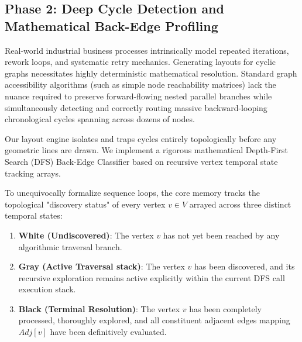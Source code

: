 \documentclass[fleqn,10pt]{wlscirep}
\begin{document}
\subsection*{Phase 2: Deep Cycle Detection and Mathematical Back-Edge Profiling}
Real-world industrial business processes intrinsically model repeated iterations, rework loops, and systematic retry mechanics. Generating layouts for cyclic graphs necessitates highly deterministic mathematical resolution. Standard graph accessibility algorithms (such as simple node reachability matrices) lack the nuance required to preserve forward-flowing nested parallel branches while simultaneously detecting and correctly routing massive backward-looping chronological cycles spanning across dozens of nodes.

Our layout engine isolates and traps cycles entirely topologically before any geometric lines are drawn. We implement a rigorous mathematical Depth-First Search (DFS) Back-Edge Classifier based on recursive vertex temporal state tracking arrays.

To unequivocally formalize sequence loops, the core memory tracks the topological "discovery status" of every vertex $v \in V$ arrayed across three distinct temporal states:
\begin{enumerate}
    \item \textbf{White (Undiscovered)}: The vertex $v$ has not yet been reached by any algorithmic traversal branch.
    \item \textbf{Gray (Active Traversal stack)}: The vertex $v$ has been discovered, and its recursive exploration remains active explicitly within the current DFS call execution stack.
    \item \textbf{Black (Terminal Resolution)}: The vertex $v$ has been completely processed, thoroughly explored, and all constituent adjacent edges mapping $Adj[v]$ have been definitively evaluated.
\end{enumerate}
\end{document}
